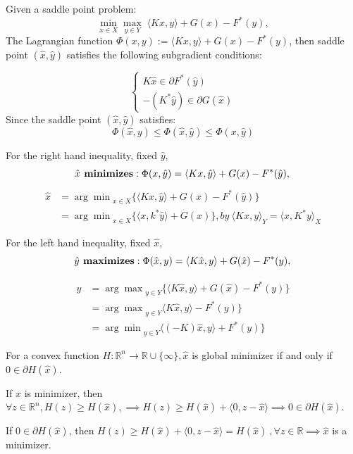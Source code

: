 \documentclass[twoside,12pt,openright]{report}  %
\begin{document}
Given a saddle point problem:
\[
\min_{x \in X} \max_{y \in Y} \; \langle Kx, y \rangle + G(x) - F^*(y),
\]
The Lagrangian function \(\Phi(x,y) := \langle Kx, y \rangle + G(x) - F^*(y)\), then saddle point \(( \hat{x},\hat{y} )\) satisfies the following subgradient conditions:

\begin{equation}
    \begin{cases}
K \hat{x} \in \partial F^*(\hat{y})\\
-(K^* \hat{y}) \in \partial G(\hat{x})
\end{cases}
\end{equation}
Since the saddle point \(( \hat{x},\hat{y} )\) satisfies:
\[
\Phi(\hat{x},y) \le \Phi(\hat{x},\hat{y}) \le \Phi(x,\hat{y})
\]

For the right hand inequality, fixed \( \hat{y}\), 
\[
\hat{x} \textbf{ minimizes}: \Phi(x,\hat{y}) = \langle Kx, \hat{y} \rangle + G(x) - F^*(\hat{y}),\\
\]
\[
\begin{aligned}
\hat{x} &= {\arg \min}_{x \in X}{\{ \langle Kx, \hat{y} \rangle + G(x) - F^*(\hat{y})} \}\\
&= {\arg \min}_{x \in X}{\{ \langle x, k^* \hat{y} \rangle + G(x)} \}, by \  \langle Kx, y \rangle_Y = \langle x, K^* y \rangle_X
\end{aligned}
\]

For the left hand inequality, fixed \( \hat{x}\), 
\[
\hat{y} \textbf{ maximizes}: \Phi(\hat{x},y) = \langle K\hat{x}, y \rangle + G(\hat{x}) - F^*(y),\\
\]

\[
\begin{aligned}
\hat{y} &= {\arg \max}_{y \in Y}{\{ \langle K\hat{x}, y \rangle + G(\hat{x}) - F^*(y)} \}\\
&= {\arg \max}_{y \in Y}{\langle K\hat{x}, y \rangle - F^*(y)} \}\\
&= {\arg \min}_{y \in Y}{\langle (-K)\hat{x}, y \rangle + F^*(y)} \}
\end{aligned}
\]

For a convex function \( H : \mathbb{R}^n \to \mathbb{R} \cup \{\infty\},\hat{x}\) is global minimizer if and only if \(0 \in \partial H (\hat{x})\).

If \(\hat{x}\) is minimizer, then \(\forall z \in \mathbb{R}^n, H(z) \ge H(\hat{x}), \implies H(z) \ge H(\hat{x}) + \langle 0, z-\hat{x}\rangle \implies 0 \in \partial H(\hat{x})\).

If \(0 \in \partial H(\hat{x})\), then \(H(z) \ge H(\hat{x}) + \langle0,z-\hat{x}\rangle = H(\hat{x}) \ ,\forall z \in\mathbb{R} \implies\hat{x}\) is a minimizer.
\end{document}
